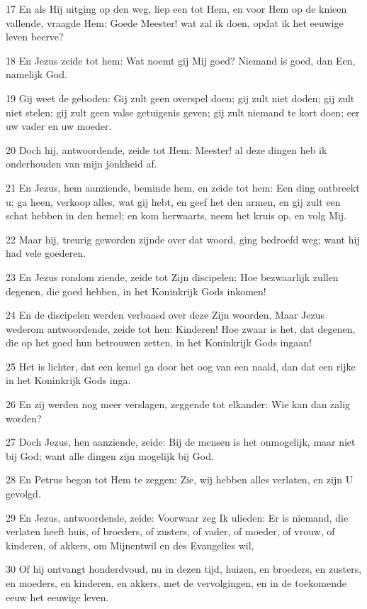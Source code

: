 \par 17 En als Hij uitging op den weg, liep een tot Hem, en voor Hem op de knieen vallende, vraagde Hem: Goede Meester! wat zal ik doen, opdat ik het eeuwige leven beerve?
\par 18 En Jezus zeide tot hem: Wat noemt gij Mij goed? Niemand is goed, dan Een, namelijk God.
\par 19 Gij weet de geboden: Gij zult geen overspel doen; gij zult niet doden; gij zult niet stelen; gij zult geen valse getuigenis geven; gij zult niemand te kort doen; eer uw vader en uw moeder.
\par 20 Doch hij, antwoordende, zeide tot Hem: Meester! al deze dingen heb ik onderhouden van mijn jonkheid af.
\par 21 En Jezus, hem aanziende, beminde hem, en zeide tot hem: Een ding ontbreekt u; ga heen, verkoop alles, wat gij hebt, en geef het den armen, en gij zult een schat hebben in den hemel; en kom herwaarts, neem het kruis op, en volg Mij.
\par 22 Maar hij, treurig geworden zijnde over dat woord, ging bedroefd weg; want hij had vele goederen.
\par 23 En Jezus rondom ziende, zeide tot Zijn discipelen: Hoe bezwaarlijk zullen degenen, die goed hebben, in het Koninkrijk Gods inkomen!
\par 24 En de discipelen werden verbaasd over deze Zijn woorden. Maar Jezus wederom antwoordende, zeide tot hen: Kinderen! Hoe zwaar is het, dat degenen, die op het goed hun betrouwen zetten, in het Koninkrijk Gods ingaan!
\par 25 Het is lichter, dat een kemel ga door het oog van een naald, dan dat een rijke in het Koninkrijk Gods inga.
\par 26 En zij werden nog meer verslagen, zeggende tot elkander: Wie kan dan zalig worden?
\par 27 Doch Jezus, hen aanziende, zeide: Bij de mensen is het onmogelijk, maar niet bij God; want alle dingen zijn mogelijk bij God.
\par 28 En Petrus begon tot Hem te zeggen: Zie, wij hebben alles verlaten, en zijn U gevolgd.
\par 29 En Jezus, antwoordende, zeide: Voorwaar zeg Ik ulieden: Er is niemand, die verlaten heeft huis, of broeders, of zusters, of vader, of moeder, of vrouw, of kinderen, of akkers, om Mijnentwil en des Evangelies wil,
\par 30 Of hij ontvangt honderdvoud, nu in dezen tijd, huizen, en broeders, en zusters, en moeders, en kinderen, en akkers, met de vervolgingen, en in de toekomende eeuw het eeuwige leven.

